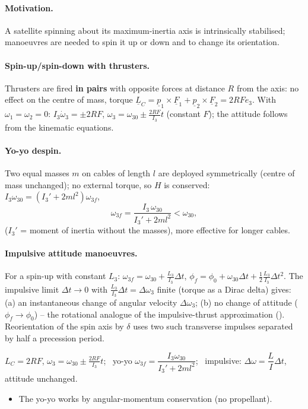 \paragraph{Motivation.} A satellite spinning about its maximum-inertia axis is intrinsically stabilised; manoeuvres are needed to spin it up or
down and to change its orientation.
\paragraph{Spin-up/spin-down with thrusters.} Thrusters are fired \textbf{in pairs} with opposite forces at distance $R$ from the axis: no effect on
the centre of mass, torque $\underline L_C=\underline p_1\times\underline F_1+\underline p_2\times\underline F_2=2RF\hat e_3$. With $\omega_1=\omega_2=0$:
$I_3\dot\omega_3=\pm2RF$, $\omega_3=\omega_{30}\pm\frac{2RF}{I_3}t$ (constant $F$); the attitude follows from the kinematic equations.
\paragraph{Yo-yo despin.} Two equal masses $m$ on cables of length $l$ are deployed symmetrically (centre of mass unchanged); no external torque, so
$H$ is conserved: $I_3\omega_{30}=(I_3'+2ml^2)\omega_{3f}$,
\begin{equation}
\omega_{3f}=\frac{I_3\,\omega_{30}}{I_3'+2ml^2}<\omega_{30},
\end{equation}
($I_3'$ = moment of inertia without the masses), more effective for longer cables.
\paragraph{Impulsive attitude manoeuvres.} For a spin-up with constant $L_3$: $\omega_{3f}=\omega_{30}+\frac{L_3}{I_3}\Delta t$,
$\phi_f=\phi_0+\omega_{30}\Delta t+\frac12\frac{L_3}{I_3}\Delta t^2$. The impulsive limit $\Delta t\to0$ with $\frac{L_3}{I_3}\Delta t=\Delta\omega_3$ finite (torque as a
Dirac delta) gives: (a) an instantaneous change of angular velocity $\Delta\omega_3$; (b) no change of attitude ($\phi_f\to\phi_0$) -- the rotational analogue of
the impulsive-thrust approximation (). Reorientation of the spin axis by $\delta$ uses two such transverse impulses separated by half a
precession period.
\begin{keyf}
$L_C=2RF$, $\omega_3=\omega_{30}\pm\frac{2RF}{I_3}t$; \ yo-yo $\omega_{3f}=\dfrac{I_3\omega_{30}}{I_3'+2ml^2}$; \ impulsive: $\Delta\omega=\dfrac{L}{I}\Delta t$, attitude unchanged.
\end{keyf}
\pitfalls
\begin{itemize}
\item The yo-yo works by angular-momentum conservation (no propellant).
\end{itemize}
